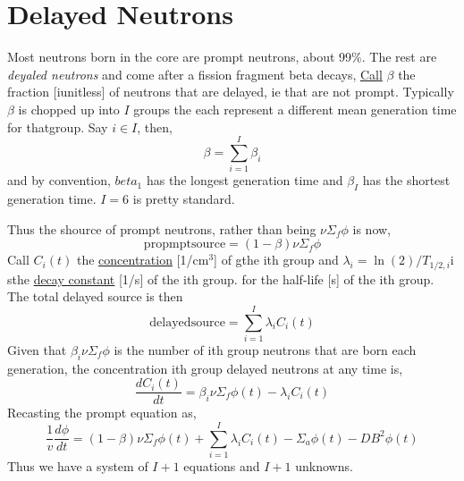 \section{Delayed Neutrons}
Most neutrons born in the core are prompt neutrons, about 99\%.
The rest are \textit{deyaled neutrons} and come after a fission
fragment beta decays,
\underline{Call} $\beta$ the fraction [iunitless] of neutrons that are delayed, ie
that are not prompt.  Typically $\beta$ is chopped up into $I$ groups the each represent
a different mean generation time for thatgroup. Say $i\in I$, then,
\[ \beta = \sum_{i=1}^I \beta_i \]
and by convention, $beta_1$ has the longest generation time and $\beta_I$ has the shortest
generation time. $I=6$ is pretty standard.

Thus the shource of prompt neutrons, rather than being $\nu\Sigma_f\phi$ is now,
\[ \mathrm{propmpt source} = (1 - \beta) \nu \Sigma_f \phi \]
Call $C_i(t)$ the \underline{concentration} [1/cm$^3$] of gthe ith group and
$\lambda_i = \ln(2) / T_{1/2, i}$i sthe \underline{decay constant} [1/s] of the
ith group. for the half-life [s] of the ith group. The total delayed source is then
\[ \mathrm{delayed source} = \sum_{i=1}^I \lambda_i C_i(t)\]
Given that $\beta_i\nu\Sigma_f\phi$
is the number of ith group neutrons that are born each generation, the concentration ith group
delayed neutrons at any time is,
\[ \frac{dC_i(t)}{dt} = \beta_i\nu\Sigma_f\phi(t) - \lambda_i C_i(t)\]
Recasting the prompt equation as,
\[ \frac{1}{v} \frac{d\phi}{dt} = (1-\beta)\nu\Sigma_f\phi(t) + \sum_{i=1}^I \lambda_i C_i(t) - \Sigma_a\phi(t) - DB^2\phi(t) \]
Thus we have a system of $I+1$ equations and $I+1$ unknowns.